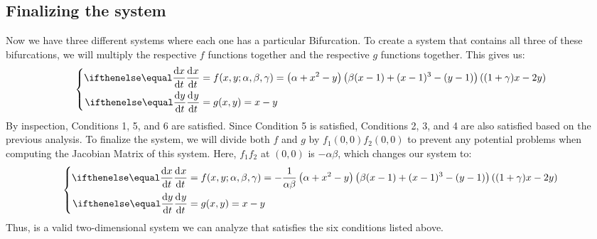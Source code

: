 \subsection{Finalizing the system}\label{subsec:finalizing-the-system}
Now we have three different systems where each one has a particular Bifurcation. To create a system that contains all three of these bifurcations, we will multiply the respective $f$ functions together and the respective $g$ functions together. This gives us:
\begin{equation*}
    \begin{dcases}
    \begin{aligned}
        \diff[]{x}{t} &= f(x,y;\alpha,\beta,\gamma) = \left(\alpha+x^2-y\right)\left(\beta(x-1)+(x-1)^3-(y-1)\right)\left((1+\gamma)x-2y\right)\\
        \diff[]{y}{t} &= g(x,y) = x-y
    \end{aligned}
    \end{dcases}
\end{equation*}
By inspection, Conditions 1, 5, and 6 are satisfied. Since Condition 5 is satisfied, Conditions 2, 3, and 4 are also satisfied based on the previous analysis. To finalize the system, we will divide both $f$ and $g$ by $f_1(0,0)f_2(0,0)$ to prevent any potential problems when computing the Jacobian Matrix of this system. Here, $f_1f_2$ at $(0,0)$ is $-\alpha\beta$, which changes our system to:
\begin{equation*}
    \begin{dcases}
    \begin{aligned}
        \diff[]{x}{t} &= f(x,y;\alpha,\beta,\gamma) = -\frac{1}{\alpha\beta}\left(\alpha+x^2-y\right)\left(\beta(x-1)+(x-1)^3-(y-1)\right)\left((1+\gamma)x-2y\right)\\
        \diff[]{y}{t} &= g(x,y) = x-y
    \end{aligned}
    \end{dcases}
\end{equation*}
Thus,  is a valid two-dimensional system we can analyze that satisfies the six conditions listed above.
